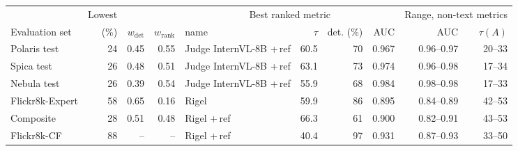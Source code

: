 \begin{tabular}{lrrrlrrrrr}
\toprule
& Lowest & & & \multicolumn{4}{c}{Best ranked metric} & \multicolumn{2}{c}{Range, non-text metrics} \\
\cmidrule(lr){5-8} \cmidrule(l){9-10}
Evaluation set & (\%) & $w_{\text{det}}$ & $w_{\text{rank}}$ & name & $\tau$ & det. (\%) & AUC & AUC & $\tau(A)$ \\
\midrule
Polaris test & 24 & 0.45 & 0.55 & Judge InternVL-8B +\,ref & 60.5 & 70 & 0.967 & 0.96--0.97 & 20--33 \\
Spica test & 26 & 0.48 & 0.51 & Judge InternVL-8B +\,ref & 63.1 & 73 & 0.974 & 0.96--0.98 & 17--34 \\
Nebula test & 26 & 0.39 & 0.54 & Judge InternVL-8B +\,ref & 55.9 & 68 & 0.984 & 0.98--0.98 & 17--33 \\
Flickr8k-Expert & 58 & 0.65 & 0.16 & Rigel & 59.9 & 86 & 0.895 & 0.84--0.89 & 42--53 \\
Composite & 28 & 0.51 & 0.48 & Rigel +\,ref & 66.3 & 61 & 0.900 & 0.82--0.91 & 43--53 \\
Flickr8k-CF & 88 & -- & -- & Rigel +\,ref & 40.4 & 97 & 0.931 & 0.87--0.93 & 33--50 \\
\bottomrule
\end{tabular}
